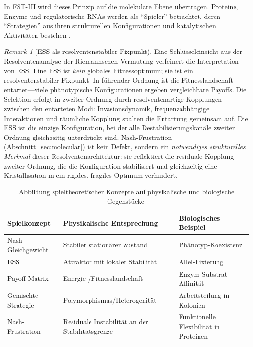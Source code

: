 \documentclass[12pt,a4paper]{article}
\theoremstyle{remark}
\newtheorem{remark}{Remark}
\begin{document}
In FST-III wird dieses Prinzip auf die molekulare Ebene \"ubertragen. Proteine, Enzyme und regulatorische RNAs werden als ``Spieler'' betrachtet, deren ``Strategien'' aus ihren strukturellen Konfigurationen und katalytischen Aktivit\"aten bestehen \citep{GameBiochemistry}.

\begin{remark}[ESS als resolventenstabiler Fixpunkt]
\label{rem:ess-resolvent}
Eine Schl\"usseleinsicht aus der Resolventenanalyse der Riemannschen Vermutung \citep{GeigerRH2026b} verfeinert die Interpretation von ESS. Eine ESS ist \emph{kein} globales Fitnessoptimum; sie ist ein resolventenstabiler Fixpunkt. In f\"uhrender Ordnung ist die Fitnesslandschaft entartet---viele ph\"anotypische Konfigurationen ergeben vergleichbare Payoffs. Die Selektion erfolgt in zweiter Ordnung durch resolventenartige Kopplungen zwischen den entarteten Modi: Invasionsdynamik, frequenzabh\"angige Interaktionen und r\"aumliche Kopplung spalten die Entartung gemeinsam auf. Die ESS ist die einzige Konfiguration, bei der alle Destabilisierungskan\"ale zweiter Ordnung gleichzeitig unterdr\"uckt sind. Nash-Frustration (Abschnitt~\ref{sec:molecular}) ist kein Defekt, sondern ein \emph{notwendiges strukturelles Merkmal} dieser Resolventenarchitektur: sie reflektiert die residuale Kopplung zweiter Ordnung, die die Konfiguration stabilisiert und gleichzeitig eine Kristallisation in ein rigides, fragiles Optimum verhindert.
\end{remark}

\begin{table}[htbp]
\centering
\caption{Abbildung spieltheoretischer Konzepte auf physikalische und biologische Gegenst\"ucke.}
\label{tab:game-biology-mapping}
\begin{tabular}{lll}
\toprule
\textbf{Spielkonzept} & \textbf{Physikalische Entsprechung} & \textbf{Biologisches Beispiel} \\
\midrule
Nash-Gleichgewicht & Stabiler station\"arer Zustand & Ph\"anotyp-Koexistenz \\
ESS & Attraktor mit lokaler Stabilit\"at & Allel-Fixierung \\
Payoff-Matrix & Energie-/Fitnesslandschaft & Enzym-Substrat-Affinit\"at \\
Gemischte Strategie & Polymorphismus/Heterogenit\"at & Arbeitsteilung in Kolonien \\
Nash-Frustration & Residuale Instabilit\"at an der Stabilit\"atsgrenze & Funktionelle Flexibilit\"at in Proteinen \\
\bottomrule
\end{tabular}
\end{table}
\end{document}
